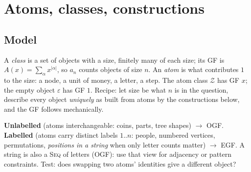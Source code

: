 \section{Atoms, classes, constructions}
	\subsection{Model}
	A \emph{class} is a set of objects with a size, finitely many of each size; its GF is $A(x)=\sum_{\alpha}x^{|\alpha|}$, so $a_n$ counts objects of size $n$. An \emph{atom} is what contributes $1$ to the size: a node, a unit of money, a letter, a step. The atom class $\mathcal Z$ has GF $x$; the empty object $\varepsilon$ has GF $1$.
	Recipe: let size be what $n$ is in the question, describe every object \emph{uniquely} as built from atoms by the constructions below, and the GF follows mechanically.

	\textbf{Unlabelled} (atoms interchangeable: coins, parts, tree shapes) $\to$ OGF. \textbf{Labelled} (atoms carry distinct labels $1..n$: people, numbered vertices, permutations, \emph{positions in a string} when only letter counts matter) $\to$ EGF. A string is also a \textsc{Seq} of letters (OGF): use that view for adjacency or pattern constraints. Test: does swapping two atoms' identities give a different object?

